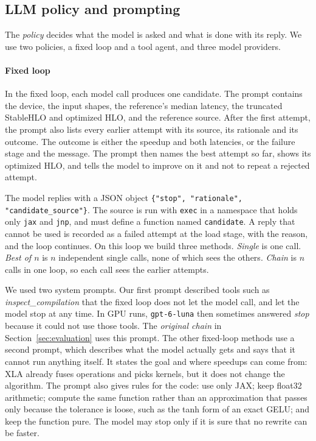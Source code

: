 \documentclass[conference]{IEEEtran}
\begin{document}
\subsection{LLM policy and prompting}
The \emph{policy} decides what the model is asked and what is done with its reply. We use two policies, a fixed loop and a tool agent, and three model providers.

\paragraph{Fixed loop}
In the fixed loop, each model call produces one candidate. The prompt
contains the device, the input shapes, the reference's median latency, the
truncated StableHLO and optimized HLO, and the reference source. After the
first attempt, the prompt also lists every earlier attempt with its source,
its rationale and its outcome. The outcome is either the speedup and both
latencies, or the failure stage and the message.
The prompt then names the best attempt so far, shows its optimized HLO, and
tells the model to improve on it and not to repeat a rejected attempt.

The model replies with a JSON object
\texttt{\{"stop", "rationale", "candidate\_source"\}}. The source is run with
\texttt{exec} in a namespace that holds only \texttt{jax} and \texttt{jnp},
and must define a function named \texttt{candidate}. A reply that cannot be
used is recorded as a failed attempt at the load stage, with the reason, and
the loop continues. On this loop we build three methods. \emph{Single} is
one call. \emph{Best of $n$} is $n$ independent single calls, none of which
sees the others. \emph{Chain} is $n$ calls in one loop, so each call sees the
earlier attempts.

We used two system prompts. Our first prompt described tools such as
\emph{inspect\_compilation} that the fixed loop does not let the model call,
and let the model stop at any time. In GPU runs, \texttt{gpt-6-luna} then
sometimes answered \emph{stop} because it could not use those tools. The
\emph{original chain} in Section~\ref{sec:evaluation} uses this prompt. The
other fixed-loop methods use a second prompt, which describes what the
model actually gets and says that it cannot run anything itself. It states
the goal and where speedups can come from: XLA already fuses operations and
picks kernels, but it does not change the algorithm. The prompt also gives
rules for the code: use only JAX; keep float32 arithmetic; compute the same
function rather than an approximation that passes only because the tolerance
is loose, such as the tanh form of an exact GELU; and keep the function pure.
The model may stop only if it is sure that no rewrite can be faster.
\end{document}
